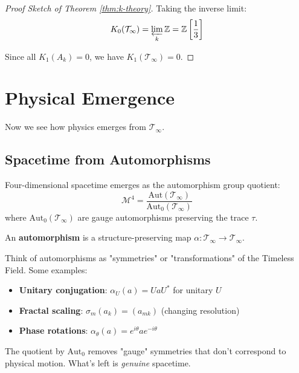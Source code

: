 \begin{defn}
\begin{proof}[Proof Sketch of Theorem \ref{thm:k-theory}]
Taking the inverse limit:
\begin{equation}
K_0(\mathcal{T}_\infty) = \varprojlim_k \mathbb{Z} = \mathbb{Z}\left[\frac{1}{3}\right]
\end{equation}

Since all $K_1(A_k) = 0$, we have $K_1(\mathcal{T}_\infty) = 0$.
\end{proof}

\section{Physical Emergence}
\label{sec:physical-emergence}

Now we see how physics emerges from $\mathcal{T}_\infty$.

\subsection{Spacetime from Automorphisms}
\label{sec:spacetime-emergence}

\begin{thm}\label{thm:spacetime-emergence}
Four-dimensional spacetime emerges as the automorphism group quotient:
\begin{equation}
\boxed{\mathcal{M}^4 = \frac{\text{Aut}(\mathcal{T}_\infty)}{\text{Aut}_0(\mathcal{T}_\infty)}}
\end{equation}
where $\text{Aut}_0(\mathcal{T}_\infty)$ are gauge automorphisms preserving the trace $\tau$.
\end{thm}

\begin{intuitive}
An \textbf{automorphism} is a structure-preserving map $\alpha: \mathcal{T}_\infty \to \mathcal{T}_\infty$.

Think of automorphisms as "symmetries" or "transformations" of the Timeless Field. Some examples:
\begin{itemize}
\item \textbf{Unitary conjugation}: $\alpha_U(a) = U a U^*$ for unitary $U$
\item \textbf{Fractal scaling}: $\sigma_m(a_k) = (a_{mk})$ (changing resolution)
\item \textbf{Phase rotations}: $\alpha_\theta(a) = e^{i\theta} a e^{-i\theta}$
\end{itemize}

The quotient by $\text{Aut}_0$ removes "gauge" symmetries that don't correspond to physical motion. What's left is \textit{genuine} spacetime.
\end{intuitive}


\end{defn}

